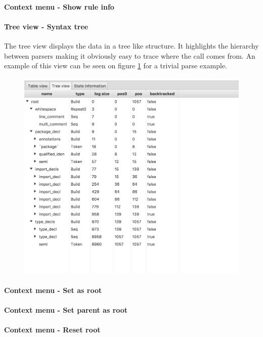 		\paragraph{Context menu - Show rule info}


		\paragraph{Tree view - Syntax tree} The tree view displays the data in a tree like structure. It highlights the hierarchy between parsers making it obviously easy to trace where the call comes from. An example of this view can be seen on figure \ref{fig:treeview} for a trivial parse example.
		
		\paragraph{}

		\begin{figure}[h]
			\centering
			\includegraphics[width=.7\textwidth] {ressources/treeview}
			\caption{} 
			\label{fig:treeview}
		\end{figure}

		\paragraph{Context menu - Set as root}
		\paragraph{Context menu - Set parent as root}
		\paragraph{Context menu - Reset root}
